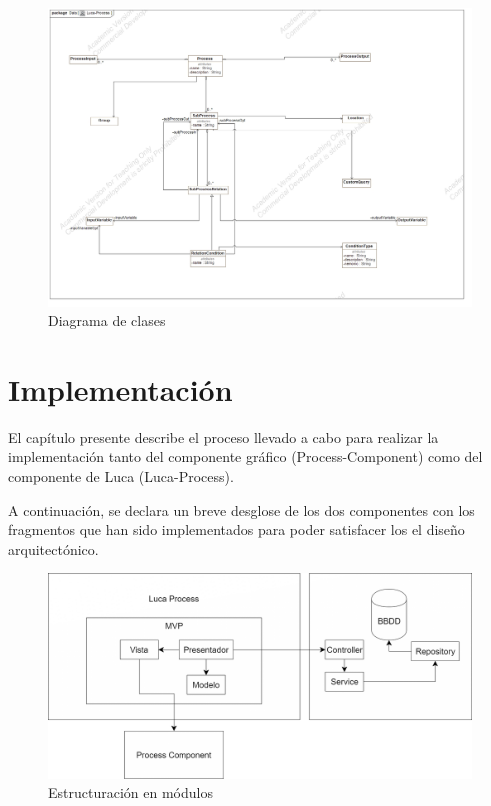 \documentclass[a4paper,12pt]{book}
\begin{document}
		\begin{figure}[H]
			\centering
			\includegraphics[scale=0.25]{Luca-Process.jpg}
			\caption{Diagrama de clases}\label{fig:Luca-Process}
		\end{figure}
	
	\afterpage{\null\newpage}
	\newpage
	
	\chapter{Implementación}
	
	El capítulo presente describe el proceso llevado a cabo para realizar la implementación tanto del componente gráfico (Process-Component) como del componente de Luca (Luca-Process).
	
	\vspace{5mm}
	
	A continuación, se declara un breve desglose de los dos componentes con los fragmentos que han sido implementados para poder satisfacer los el diseño arquitectónico.
	
	\begin{figure}[H]
		\centering
		\includegraphics[scale=0.25]{esquema_proyecto.png}
		\caption{Estructuración en módulos}\label{fig:esquema_proyecto}
	\end{figure}
	
\end{document}
